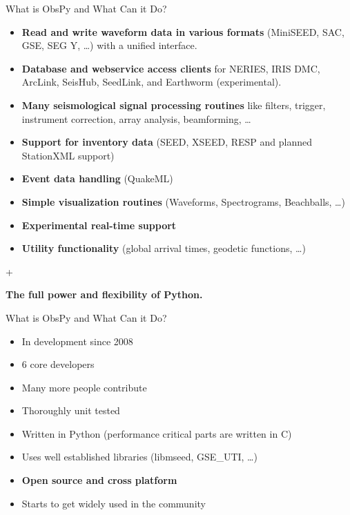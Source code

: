 \documentclass[handout]{beamer}
\begin{document}
\begin{frame}[plain]{What is ObsPy and What Can it Do?}
    \begin{itemize}
        \item \textbf{Read and write waveform data in various formats} \small{(MiniSEED, SAC, GSE, SEG Y, \dots) with a unified interface.}
        \item \textbf{Database and webservice access clients} \small{for NERIES, IRIS DMC, ArcLink, SeisHub, SeedLink, and Earthworm (experimental).}
        \item \textbf{Many seismological signal processing routines} \small{like filters, trigger, instrument correction, array analysis, beamforming, \dots}
        \item \textbf{Support for inventory data} \small{(SEED, XSEED, RESP and planned StationXML support)}
        \item \textbf{Event data handling} \small{(QuakeML)}
        \item \textbf{Simple visualization routines} \small{(Waveforms, Spectrograms, Beachballs, \ldots)}
        \item \textbf{Experimental real-time support}
        \item \textbf{Utility functionality} \small{(global arrival times, geodetic functions, \ldots)}
    \end{itemize}
    \begin{center}
        +
    \end{center}

    \begin{center}
        \textbf{The full power and flexibility of Python.}
    \end{center}

\end{frame}


\begin{frame}[plain]{What is ObsPy and What Can it Do?}
    \begin{itemize}
        \item In development since 2008
        \item 6 core developers
        \item Many more people contribute
        \item Thoroughly unit tested
        \item Written in Python (performance critical parts are written in C)
        \item Uses well established libraries (libmseed, GSE\_UTI, \dots)
        \item \textbf{Open source and cross platform}
        \item Starts to get widely used in the community
    \end{itemize}
\end{frame}
\end{document}
